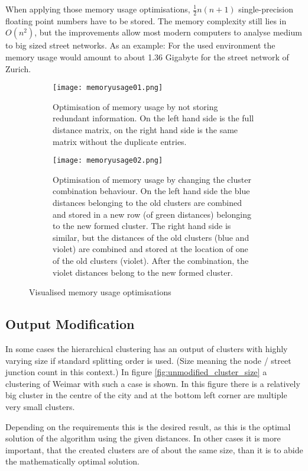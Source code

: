 When applying those memory usage optimisations, $\frac{1}{2}n(n+1)$ single-precision floating point numbers have to be stored. The memory complexity still lies in $O(n^2)$, but the improvements allow most modern computers to analyse medium to big sized street networks. As an example: For the used environment the memory usage would amount to about 1.36 Gigabyte for the street network of Zurich.

\begin{figure}
    \centering
    \begin{subfigure}[b]{\textwidth}
        \texttt{[image: memoryusage01.png]}
        \caption{Optimisation of memory usage by not storing redundant information. On the left hand side is the full distance matrix, on the right hand side is the same matrix without the duplicate entries.}
        \label{fig:memory_usage_01}
    \end{subfigure}
    \par\medskip
    \begin{subfigure}[b]{\textwidth}
        \texttt{[image: memoryusage02.png]}
        \caption{Optimisation of memory usage by changing the cluster combination behaviour. On the left hand side the blue distances belonging to the old clusters are combined and stored in a new row (of green distances) belonging to the new formed cluster. The right hand side is similar, but the distances of the old clusters (blue and violet) are combined and stored at the location of one of the old clusters (violet). After the combination, the violet distances belong to the new formed cluster.}
        \label{fig:memory_usage_02}
    \end{subfigure}
    \caption{Visualised memory usage optimisations}
\end{figure}

\subsection{Output Modification} \label{sec:outout_modification}
In some cases the hierarchical clustering has an output of clusters with highly varying size if standard splitting order is used. (Size meaning the node / street junction count in this context.) In figure \ref{fig:unmodified_cluster_size} a clustering of Weimar with such a case is shown. In this figure there is a relatively big cluster in the centre of the city and at the bottom left corner are multiple very small clusters.

Depending on the requirements this is the desired result, as this is the optimal solution of the algorithm using the given distances. In other cases it is more important, that the created clusters are of about the same size, than it is to abide the mathematically optimal solution.

